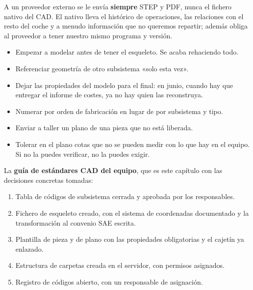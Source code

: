 \begin{clave}
A un proveedor externo se le envía \textbf{siempre} STEP y PDF, nunca el fichero
nativo del CAD. El nativo lleva el histórico de operaciones, las relaciones con el
resto del coche y a menudo información que no queremos repartir; además obliga al
proveedor a tener nuestro mismo programa y versión.
\end{clave}


\begin{caso}
\end{caso}

\begin{ojo}
\begin{itemize}
  \item Empezar a modelar antes de tener el esqueleto. Se acaba rehaciendo todo.
  \item Referenciar geometría de otro subsistema «solo esta vez».
  \item Dejar las propiedades del modelo para el final: en junio, cuando hay que
        entregar el informe de costes, ya no hay quien las reconstruya.
  \item Numerar por orden de fabricación en lugar de por subsistema y tipo.
  \item Enviar a taller un plano de una pieza que no está liberada.
  \item Tolerar en el plano cotas que no se pueden medir con lo que hay en el
        equipo. Si no la puedes verificar, no la puedes exigir.
\end{itemize}
\end{ojo}

\begin{entregable}
La \textbf{guía de estándares CAD del equipo}, que es este capítulo con las
decisiones concretas tomadas:

\begin{enumerate}
  \item Tabla de códigos de subsistema cerrada y aprobada por los responsables.
  \item Fichero de esqueleto creado, con el sistema de coordenadas documentado y
        la transformación al convenio SAE escrita.
  \item Plantilla de pieza y de plano con las propiedades obligatorias y el
        cajetín ya enlazado.
  \item Estructura de carpetas creada en el servidor, con permisos asignados.
  \item Registro de códigos abierto, con un responsable de asignación.
\end{enumerate}
\end{entregable}

